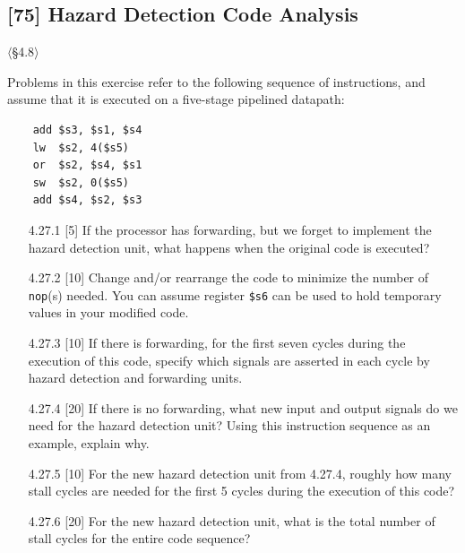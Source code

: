 \subsection{[75] Hazard Detection Code Analysis}
\hypertarget{prob-4.27}{}
\noindent$\langle$\S4.8$\rangle$\medskip

\noindent Problems in this exercise refer to the following sequence of
instructions, and assume that it is executed on a five-stage pipelined
datapath:
\begin{verbatim}
    add $s3, $s1, $s4
    lw  $s2, 4($s5)
    or  $s2, $s4, $s1
    sw  $s2, 0($s5)
    add $s4, $s2, $s3
\end{verbatim}

\begin{enumerate}
  \item[4.27.1] [5] If the processor has forwarding, but we forget to
        implement the hazard detection unit, what happens when the original
        code is executed?
  \item[4.27.2] [10] Change and/or rearrange the code to minimize the number
        of \texttt{nop}(s) needed. You can assume register \texttt{\$s6} can
        be used to hold temporary values in your modified code.
  \item[4.27.3] [10] If there is forwarding, for the first seven cycles
        during the execution of this code, specify which signals are asserted
        in each cycle by hazard detection and forwarding units.
  \item[4.27.4] [20] If there is no forwarding, what new input and output
        signals do we need for the hazard detection unit? Using this
        instruction sequence as an example, explain why.
  \item[4.27.5] [10] For the new hazard detection unit from 4.27.4, roughly
        how many stall cycles are needed for the first 5 cycles during the
        execution of this code?
  \item[4.27.6] [20] For the new hazard detection unit, what is the total
        number of stall cycles for the entire code sequence?
\end{enumerate}

